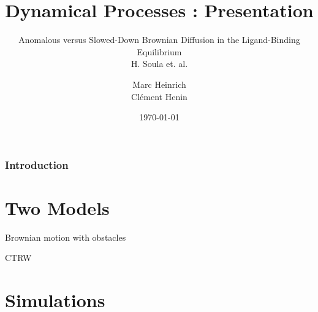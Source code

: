 \documentclass{beamer}
\title{Dynamical Processes : Presentation}
\subtitle{Anomalous versus Slowed-Down Brownian Diffusion
in the Ligand-Binding Equilibrium \\ H. Soula et. al.}
\author{Marc Heinrich \\ Clément Henin}
\date\today
\begin{document}
\begin{frame}
\maketitle
\end{frame}

\begin{frame}
\frametitle{Introduction}
\end{frame}

\section{Two Models}

\begin{frame}{Brownian motion with obstacles}
\end{frame}

\begin{frame}
\end{frame}

\begin{frame}{CTRW}
\end{frame}

\begin{frame}
\end{frame}

\begin{frame}
\end{frame}

\begin{frame}
\end{frame}

\section{Simulations}

\begin{frame}
\end{frame}

\begin{frame}
\end{frame}

\begin{frame}

\end{frame}
\end{document}
